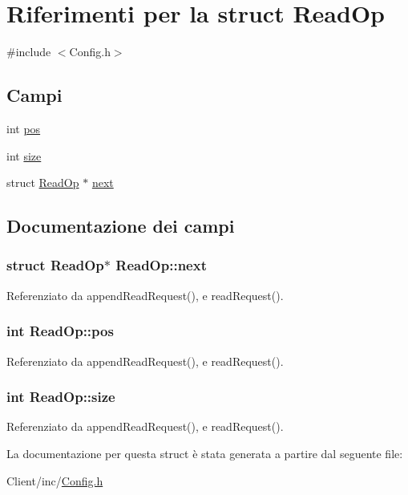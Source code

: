 \hypertarget{structReadOp}{\section{Riferimenti per la struct Read\+Op}
\label{structReadOp}
}


{\ttfamily \#include $<$Config.\+h$>$}

\subsection*{Campi}
\begin{DoxyCompactItemize}
\item 
int \hyperlink{structReadOp_a2615c975be53dbd950cb51959009257a}{pos}
\item 
int \hyperlink{structReadOp_a4ed8bd364b1b3378cc6f4faf750da527}{size}
\item 
struct \hyperlink{structReadOp}{Read\+Op} $\ast$ \hyperlink{structReadOp_ac84186a2d784cb2fbd0c71dd7d5df78d}{next}
\end{DoxyCompactItemize}


\subsection{Documentazione dei campi}
\hypertarget{structReadOp_ac84186a2d784cb2fbd0c71dd7d5df78d}{
\subsubsection[{next}]{\setlength{\rightskip}{0pt plus 5cm}struct {\bf Read\+Op}$\ast$ Read\+Op\+::next}}\label{structReadOp_ac84186a2d784cb2fbd0c71dd7d5df78d}


Referenziato da append\+Read\+Request(), e read\+Request().

\hypertarget{structReadOp_a2615c975be53dbd950cb51959009257a}{
\subsubsection[{pos}]{\setlength{\rightskip}{0pt plus 5cm}int Read\+Op\+::pos}}\label{structReadOp_a2615c975be53dbd950cb51959009257a}


Referenziato da append\+Read\+Request(), e read\+Request().

\hypertarget{structReadOp_a4ed8bd364b1b3378cc6f4faf750da527}{
\subsubsection[{size}]{\setlength{\rightskip}{0pt plus 5cm}int Read\+Op\+::size}}\label{structReadOp_a4ed8bd364b1b3378cc6f4faf750da527}


Referenziato da append\+Read\+Request(), e read\+Request().



La documentazione per questa struct è stata generata a partire dal seguente file\+:\begin{DoxyCompactItemize}
\item 
Client/inc/\hyperlink{Client_2inc_2Config_8h}{Config.\+h}\end{DoxyCompactItemize}
